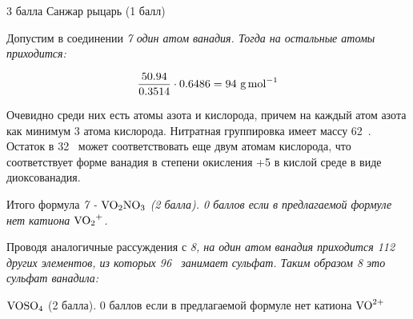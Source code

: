 \begin{solbox}{3 балла}
  Санжар рыцарь (1 балл)

  Допустим в соединении \em{7} один атом ванадия. Тогда на остальные атомы приходится:

  \begin{equation*}
    \frac{50.94}{0.3514} \cdot 0.6486 = 94~\unit{\gmol}
  \end{equation*}

  Очевидно среди них есть атомы азота и кислорода, причем на каждый атом азота как минимум 3 атома кислорода. Нитратная группировка имеет массу 62~\unit{\gmol}. Остаток в 32~\unit{\gmol} может соответствовать еще двум атомам кислорода, что  соответствует форме ванадия в степени окисления +5 в кислой среде в виде диоксованадия. 

  Итого формула \em{7} - $\ce{VO2NO3}$ (2 балла). 0 баллов если в предлагаемой формуле нет катиона $\ce{VO2+}$.

  Проводя аналогичные рассуждения с \em{8}, на один атом ванадия приходится 112~\unit{\gmol} других элементов, из которых 96~\unit{\gmol} занимает сульфат. Таким образом \em{8} это сульфат ванадила:

  $\ce{VOSO4}$ (2 балла). 0 баллов если в предлагаемой формуле нет катиона $\ce{VO^2+}$
\end{solbox}
